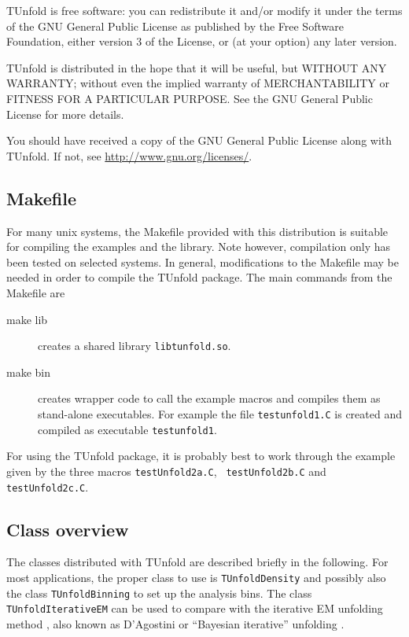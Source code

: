 \documentclass[12pt]{article}
\begin{document}
TUnfold is free software: you can redistribute it and/or modify
it under the terms of the GNU General Public License as published by
the Free Software Foundation, either version 3 of the License, or
(at your option) any later version.

TUnfold is distributed in the hope that it will be useful,
but WITHOUT ANY WARRANTY; without even the implied warranty of
MERCHANTABILITY or FITNESS FOR A PARTICULAR PURPOSE.  See the
GNU General Public License for more details.

You should have received a copy of the GNU General Public License
along with TUnfold.  If not, see \url{http://www.gnu.org/licenses/}.
\subsection{Makefile}

For many unix systems, the Makefile provided with this distribution
is suitable for compiling the examples and the library. Note however,
compilation only has been 
tested on selected systems. In general, modifications to the Makefile
may be needed in order to compile the TUnfold package.
The main commands from the Makefile are
\begin{description}
\item[make lib] creates a shared library {\tt libtunfold.so}.
\item[make bin] creates wrapper code to call the example macros and
  compiles them as stand-alone executables. For example the file
  {\tt testunfold1.C} is created and compiled as executable {\tt testunfold1}.
\end{description}
For using the TUnfold package, it is probably best to work through the
example given by the three macros {\tt testUnfold2a.C}, {\tt
  testUnfold2b.C} and {\tt testUnfold2c.C}.

\subsection{Class overview}

The classes distributed with TUnfold are described briefly in the
following. For most applications, the 
proper class to use is {\tt TUnfoldDensity} and possibly also the class
{\tt TUnfoldBinning} to set up the analysis bins. The class
{\tt TUnfoldIterativeEM} can be used to compare with the iterative EM
unfolding method \cite{richardson1972,lucy1974,vardi1985,multhei1986}, 
also known as D'Agostini or ``Bayesian iterative'' unfolding \cite{agostini}.
\end{document}
